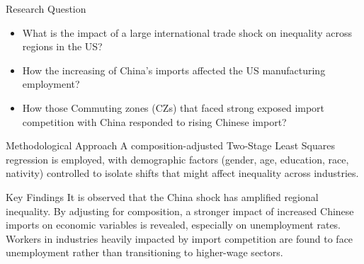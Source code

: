 \begin{frame}

    \begin{block}{Research Question}
        \begin{itemize}
        \item What is the impact of a large international trade shock on inequality across regions in the US?
        \item How the increasing of China’s imports affected the US manufacturing employment?
        \item How those Commuting zones (CZs) that faced strong exposed import competition with China responded to rising Chinese import?
        \end{itemize}
    \end{block}
    
    \begin{block}{Methodological Approach} 
        A composition-adjusted Two-Stage Least Squares regression is employed, with demographic factors (gender, age, education, race, nativity) controlled to isolate shifts that might affect inequality across industries.
    \end{block}
    
    \begin{block}{Key Findings} 
        It is observed that the China shock has amplified regional inequality. By adjusting for composition, a stronger impact of increased Chinese imports on economic variables is revealed, especially on unemployment rates. Workers in industries heavily impacted by import competition are found to face unemployment rather than transitioning to higher-wage sectors.
    \end{block}
    
\end{frame}